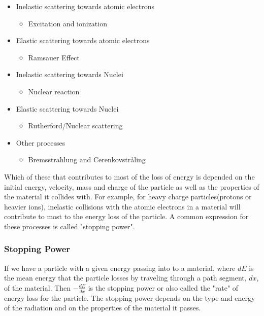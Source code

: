 \documentclass[12pt]{article}
\numberwithin{figure}{section}
\begin{document}
\begin{itemize}
  \item Inelastic scattering towards atomic electrons \hfill
  \begin{itemize}
    \item Excitation and ionization
  \end{itemize}
  \item Elastic scattering towards atomic electrons \hfill
  \begin{itemize}
  \item Ramsauer Effect
  \end{itemize}
  \item Inelastic scattering towards Nuclei \hfill
  \begin{itemize}
  \item Nuclear reaction
  \end{itemize}
  \item Elastic scattering towards Nuclei  \hfill
  \begin{itemize}
  \item Rutherford/Nuclear scattering
  \end{itemize}
  \item Other processes \hfill
  \begin{itemize}
  \item Bremsstrahlung and Cerenkovstråling
  \end{itemize}
\end{itemize}

Which of these that contributes to most of the loss of energy is depended on the initial energy, velocity, mass and charge of the particle as well as the properties of the material it collides with.
For example, for heavy charge particles(protons or heavier ions), inelastic collisions with the atomic electrons in a material will contribute to most to the energy loss of the particle.
A common expression for these processes is called "stopping power".

\subsubsection{Stopping Power}
If we have a particle with a given energy passing into to a material, where $dE$ is the mean energy that the particle losses by traveling through a path segment, $dx$, of the material.
Then $-\frac{dE}{dx}$ is the stopping power or also called the "rate" of energy loss for the particle.
The stopping power depends on the type and energy of the radiation and on the properties of the material it passes.
\end{document}

